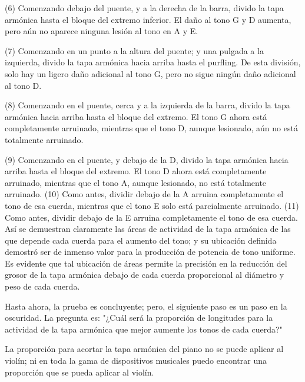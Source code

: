 \documentclass[12pt]{book}
\begin{document}
(6) Comenzando debajo del puente, y a la derecha de la barra, divido la tapa armónica hasta el bloque del extremo inferior. El daño al tono G y D aumenta, pero aún no aparece ninguna lesión al tono en A y E.

(7) Comenzando en un punto a la altura del puente; y una pulgada a la izquierda, divido la tapa armónica hacia arriba hasta el purfling. De esta división, solo hay un ligero daño adicional al tono G, pero no sigue ningún daño adicional al tono D.

(8) Comenzando en el puente, cerca y a la izquierda de la barra, divido la tapa armónica hacia arriba hasta el bloque del extremo. El tono G ahora está completamente arruinado, mientras que el tono D, aunque lesionado, aún no está totalmente arruinado.

(9) Comenzando en el puente, y debajo de la D, divido la tapa armónica hacia arriba hasta el bloque del extremo. El tono D ahora está completamente arruinado, mientras que el tono A, aunque lesionado, no está totalmente arruinado. (10) Como antes, dividir debajo de la A arruina completamente el tono de esa cuerda, mientras que el tono E solo está parcialmente arruinado. (11) Como antes, dividir debajo de la E arruina completamente el tono de esa cuerda. Así se demuestran claramente las áreas de actividad de la tapa armónica de las que depende cada cuerda para el aumento del tono; y su ubicación definida demostró ser de inmenso valor para la producción de potencia de tono uniforme. Es evidente que tal ubicación de áreas permite la precisión en la reducción del grosor de la tapa armónica debajo de cada cuerda proporcional al diámetro y peso de cada cuerda.

Hasta ahora, la prueba es concluyente; pero, el siguiente paso es un paso en la oscuridad. La pregunta es: "¿Cuál será la proporción de longitudes para la actividad de la tapa armónica que mejor aumente los tonos de cada cuerda?"

La proporción para acortar la tapa armónica del piano no se puede aplicar al violín; ni en toda la gama de dispositivos musicales puedo encontrar una proporción que se pueda aplicar al violín.
\end{document}
